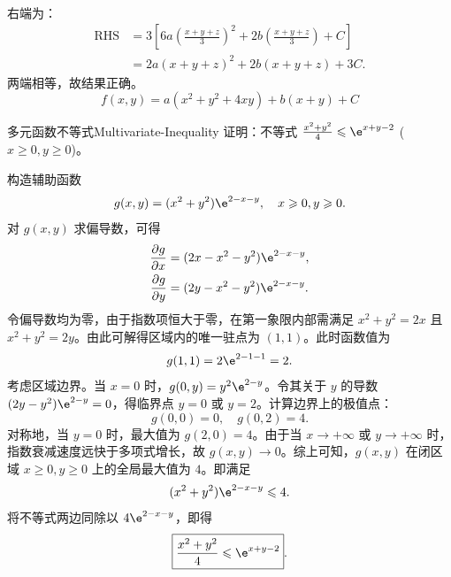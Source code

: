 \begin{solution}
\begin{equation}
\begin{aligned}
        \end{aligned}
    \end{equation}
    右端为：
    \begin{equation}
        \begin{aligned}
            \text{RHS} & = 3 \left[ 6a \left( \frac{x+y+z}{3} \right)^2 + 2b \left( \frac{x+y+z}{3} \right) + C \right] \\
                       & = 2a(x+y+z)^2 + 2b(x+y+z) + 3C.
        \end{aligned}
    \end{equation}
    两端相等，故结果正确。
    \begin{equation}
        \boxed{f(x,y) = a(x^2 + y^2 + 4xy) + b(x + y) + C}
    \end{equation}
\end{solution}


\begin{problem}{多元函数不等式}{Multivariate-Inequality}
    证明：不等式 $\frac{x^2+y^2}{4} \leqslant \e^{x+y-2}$ ($x \geqslant 0, y \geqslant 0$)。
\end{problem}

\begin{myproof}
    构造辅助函数
    \begin{equation}
        g(x, y) = (x^2 + y^2) \e^{2-x-y}, \quad x \geqslant 0, y \geqslant 0.
    \end{equation}
    对 $g(x, y)$ 求偏导数，可得
    \begin{equation}
        \begin{aligned}
            \frac{\partial g}{\partial x} & = (2x - x^2 - y^2) \e^{2-x-y}, \\
            \frac{\partial g}{\partial y} & = (2y - x^2 - y^2) \e^{2-x-y}.
        \end{aligned}
    \end{equation}
    令偏导数均为零，由于指数项恒大于零，在第一象限内部需满足 $x^2 + y^2 = 2x$ 且 $x^2 + y^2 = 2y$。由此可解得区域内的唯一驻点为 $(1, 1)$。此时函数值为
    \begin{equation}
        g(1, 1) = 2 \e^{2-1-1} = 2.
    \end{equation}
    考虑区域边界。当 $x = 0$ 时，$g(0, y) = y^2 \e^{2-y}$。令其关于 $y$ 的导数 $(2y - y^2) \e^{2-y} = 0$，得临界点 $y = 0$ 或 $y = 2$。计算边界上的极值点：
    \begin{equation}
        g(0, 0) = 0, \quad g(0, 2) = 4.
    \end{equation}
    对称地，当 $y = 0$ 时，最大值为 $g(2, 0) = 4$。由于当 $x \to +\infty$ 或 $y \to +\infty$ 时，指数衰减速度远快于多项式增长，故 $g(x, y) \to 0$。综上可知，$g(x, y)$ 在闭区域 $x \geqslant 0, y \geqslant 0$ 上的全局最大值为 $4$。即满足
    \begin{equation}
        (x^2 + y^2) \e^{2-x-y} \leqslant 4.
    \end{equation}
    将不等式两边同除以 $4\e^{2-x-y}$，即得
    \begin{equation}
        \boxed{\frac{x^2+y^2}{4} \leqslant \e^{x+y-2}}.
    \end{equation}
\end{myproof}


